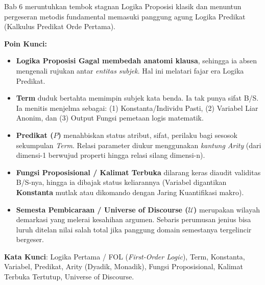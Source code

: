 \documentclass[../main]{subfiles}
\begin{document}

\begin{rangkuman}
Bab 6 meruntuhkan tembok stagnan Logika Proposisi klasik dan menuntun pergeseran metodis fundamental memasuki panggung agung Logika Predikat (Kalkulus Predikat Orde Pertama). 

\textbf{Poin Kunci:}
\begin{itemize}
  \item \textbf{Logika Proposisi Gagal membedah anatomi klausa}, sehingga ia absen mengenali rujukan antar \textit{entitas subjek}. Hal ini melatari fajar era Logika Predikat.
  \item \textbf{Term} duduk bertahta memimpin subjek kata benda. Ia tak punya sifat B/S. Ia menitis menjelma sebagai: (1) Konstanta/Individu Pasti, (2) Variabel Liar Anonim, dan (3) Output Fungsi pemetaan logis matematik.
  \item \textbf{Predikat ($P$)} menahbiskan status atribut, sifat, perilaku bagi sesosok sekumpulan \textit{Term}. Relasi parameter diukur menggunakan \textit{kantung Arity} (dari dimensi-1 berwujud properti hingga relasi silang dimensi-n).
  \item \textbf{Fungsi Proposisional / Kalimat Terbuka} dilarang keras diaudit validitas B/S-nya, hingga ia dibajak status keliarannya (Variabel digantikan \textbf{Konstanta} mutlak atau dikomando dengan Jaring Kuantifikasi makro).
  \item \textbf{Semesta Pembicaraan / Universe of Discourse ($\mathcal{U}$)} merupakan wilayah demarkasi yang melerai kesahihan argumen. Sebaris perumusan jenius bisa luruh ditelan nilai salah total jika panggung domain semestanya tergelincir bergeser.
\end{itemize}

\textbf{Kata Kunci}: Logika Pertama / FOL (\textit{First-Order Logic}), Term, Konstanta, Variabel, Predikat, Arity (Dyadik, Monadik), Fungsi Proposisional, Kalimat Terbuka Tertutup, Universe of Discourse.
\end{rangkuman}

\ifSubfilesClassLoaded{
  \renewcommand{\bibname}{Daftar Pustaka}
  
  
}{}
\end{document}
